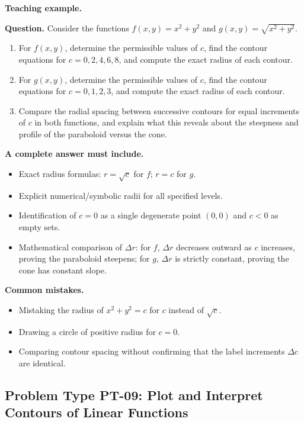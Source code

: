 \documentclass[11pt,letterpaper]{article}
\begin{document}
\textbf{Teaching example.}

\textbf{Question.} 
Consider the functions $f(x,y) = x^2 + y^2$ and $g(x,y) = \sqrt{x^2 + y^2}$.
\begin{enumerate}[label=(\alph*),nosep]
    \item For $f(x,y)$, determine the permissible values of $c$, find the contour equations for $c = 0, 2, 4, 6, 8$, and compute the exact radius of each contour.
    \item For $g(x,y)$, determine the permissible values of $c$, find the contour equations for $c = 0, 1, 2, 3$, and compute the exact radius of each contour.
    \item Compare the radial spacing between successive contours for equal increments of $c$ in both functions, and explain what this reveals about the steepness and profile of the paraboloid versus the cone.
\end{enumerate}

\textbf{A complete answer must include.}
\begin{itemize}[leftmargin=*,nosep]
    \item Exact radius formulas: $r = \sqrt{c}$ for $f$; $r = c$ for $g$.
    \item Explicit numerical/symbolic radii for all specified levels.
    \item Identification of $c=0$ as a single degenerate point $(0,0)$ and $c<0$ as empty sets.
    \item Mathematical comparison of $\Delta r$: for $f$, $\Delta r$ decreases outward as $c$ increases, proving the paraboloid steepens; for $g$, $\Delta r$ is strictly constant, proving the cone has constant slope.
\end{itemize}

\textbf{Common mistakes.}
\begin{itemize}[leftmargin=*,nosep]
    \item Mistaking the radius of $x^2+y^2=c$ for $c$ instead of $\sqrt{c}$.
    \item Drawing a circle of positive radius for $c=0$.
    \item Comparing contour spacing without confirming that the label increments $\Delta c$ are identical.
\end{itemize}

\subsection{Problem Type PT-09: Plot and Interpret Contours of Linear Functions}\label{pt:09}
\end{document}
